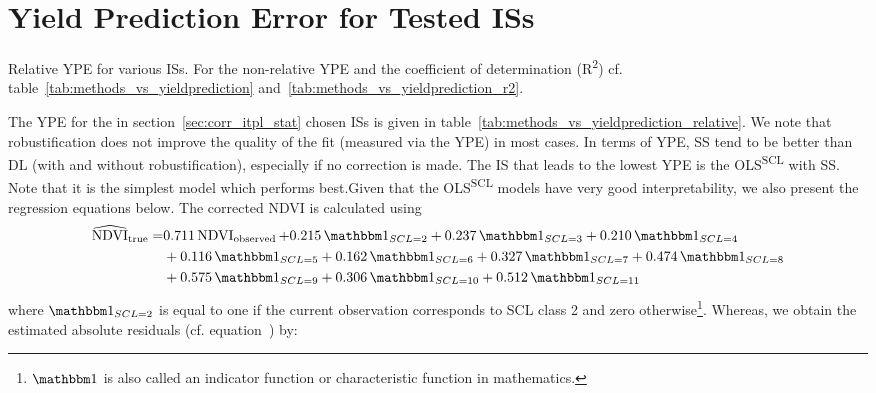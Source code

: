 \section{Yield Prediction Error for Tested ISs} \label{sec:results_ndvi_corr}
	\begin{table}
		\begin{center}
			\caption[Relative Yield Estimation Error for ISs]{Relative YPE for various ISs. For the non-relative YPE and the coefficient of determination (R\textsuperscript{2}) cf. table~\ref{tab:methods_vs_yieldprediction} and~\ref{tab:methods_vs_yieldprediction_r2}.}
			\small
			
			\label{tab:methods_vs_yieldprediction_relative}
			\normalsize
		\end{center}
	\end{table}
	The YPE for the in section~\ref{sec:corr_itpl_stat} chosen {{IS}}s is given in table~\ref{tab:methods_vs_yieldprediction_relative}. We note that robustification does not improve the quality of the fit (measured via the YPE) in most cases. 
	In terms of YPE, SS tend to be better than DL (with and without robustification), especially if no correction is made. The {{IS}} that leads to the lowest YPE is the OLS\textsuperscript{SCL} with SS. Note that it is the simplest model which performs best.Given that the OLS\textsuperscript{SCL} models have very good interpretability, we also present the regression equations below. The corrected NDVI is calculated using 
	\begin{equation}\label{eq:corr_lm}
		\begin{aligned}		
			{\widehat{\operatorname{NDVI}}}_{\text{true}}  = &
			0.711 \operatorname{NDVI}_\text{observed}  
			+ 0.215 \,\mathbbm 1_{{SCL = 2}} 
			+ 0.237 \,\mathbbm 1_{{SCL = 3}} 
			+ 0.210 \,\mathbbm 1_{{SCL = 4}} \\ &
			+ 0.116 \,\mathbbm 1_{{SCL = 5}} 
			+ 0.162 \,\mathbbm 1_{{SCL = 6}} 
			+ 0.327 \,\mathbbm 1_{{SCL = 7}} 
			+ 0.474 \,\mathbbm 1_{{SCL = 8}} \\ &
			+ 0.575 \,\mathbbm 1_{{SCL = 9}} 
			+ 0.306 \,\mathbbm 1_{{SCL = 10}} 
			+ 0.512 \,\mathbbm 1_{{SCL = 11}} 
		\end{aligned}
	\end{equation} 
	where $\mathbbm 1_{{SCL = 2}}$ is equal to one if the current observation corresponds to SCL class 2 and zero otherwise\footnote{$\mathbbm 1$ is also called an indicator function or characteristic function in mathematics.}. Whereas, we obtain the estimated absolute residuals (cf. equation~) by: 
